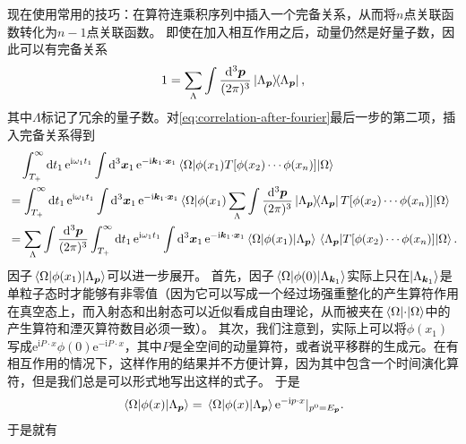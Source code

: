 \documentclass[hyperref, UTF8, a4paper]{ctexart}
\newcommand*{\ii}{\mathrm{i}}
\newcommand*{\ee}{\mathrm{e}}
\begin{document}
现在使用常用的技巧：在算符连乘积序列中插入一个完备关系，从而将$n$点关联函数转化为$n-1$点关联函数。
即使在加入相互作用之后，动量仍然是好量子数，因此可以有完备关系
\[
    1 = \sum_{\Lambda} \int \frac{\dd[3]{\vb*{p}}}{(2\pi)^3} \dyad*{\Lambda_{\vb*{p}}}, 
\]
其中$\Lambda$标记了冗余的量子数。对\eqref{eq:correlation-after-fourier}最后一步的第二项，插入完备关系得到
\[
    \begin{aligned}
        &\quad \int_{T_+}^{\infty} \dd{t_1} \ee^{\ii \omega_1 t_1} \int \dd[3]{\vb*{x}_1} \ee^{- \ii \vb*{k}_1 \cdot \vb*{x}_1} \mel{\Omega}{\phi(x_1) T [\phi(x_2) \cdots \phi(x_n)]}{\Omega} \\
        &= \int_{T_+}^{\infty} \dd{t_1} \ee^{\ii \omega_1 t_1} \int \dd[3]{\vb*{x}_1} \ee^{- \ii \vb*{k}_1 \cdot \vb*{x}_1} \mel*{\Omega}{\phi(x_1) \sum_{\Lambda} \int \frac{\dd[3]{\vb*{p}}}{(2\pi)^3} \dyad*{\Lambda_{\vb*{p}}} T [\phi(x_2) \cdots \phi(x_n)]}{\Omega} \\
        &= \sum_{\Lambda} \int \frac{\dd[3]{\vb*{p}}}{(2\pi)^3} \int_{T_+}^{\infty} \dd{t_1} \ee^{\ii \omega_1 t_1} \int \dd[3]{\vb*{x}_1} \ee^{- \ii \vb*{k}_1 \cdot \vb*{x}_1} \mel*{\Omega}{\phi(x_1)}{\Lambda_{\vb*{p}}} \mel*{\Lambda_{\vb*{p}}}{T [\phi(x_2) \cdots \phi(x_n)]}{\Omega}.
    \end{aligned}
\]
因子$\mel*{\Omega}{\phi(x_1)}{\Lambda_{\vb*{p}}}$可以进一步展开。
首先，因子$\mel*{\Omega}{\phi(0)}{\Lambda_{\vb*{k}_1}}$实际上只在$\ket{\Lambda_{\vb*{k}_1}}$是单粒子态时才能够有非零值（因为它可以写成一个经过场强重整化的产生算符作用在真空态上，而入射态和出射态可以近似看成自由理论，从而被夹在$\mel*{\Omega}{\cdot}{\Omega}$中的产生算符和湮灭算符数目必须一致）。
其次，我们注意到，实际上可以将$\phi(x_1)$写成$\ee^{\ii P \cdot x} \phi(0) \ee^{- \ii P \cdot x}$，其中$P$是全空间的动量算符，或者说平移群的生成元。在有相互作用的情况下，这样作用的结果并不方便计算，因为其中包含一个时间演化算符，但是我们总是可以形式地写出这样的式子。
于是
\[
    \mel*{\Omega}{\phi(x)}{\Lambda_{\vb*{p}}} = \mel*{\Omega}{\phi(x)}{\Lambda_{\vb*{p}}} \ee^{- \ii p \cdot x} |_{p^0 = E_{\vb*{p}}}. 
\]
于是就有
\end{document}
